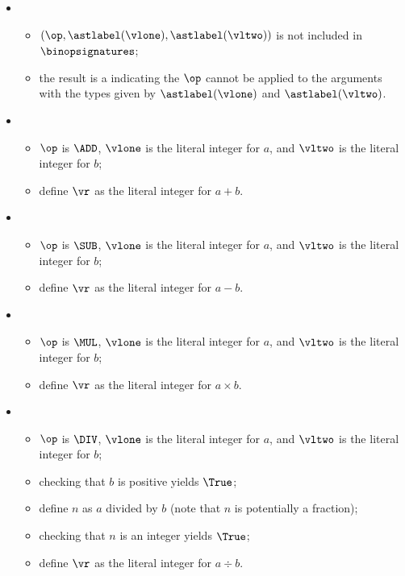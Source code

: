 \ProseParagraph
\OneApplies
\begin{itemize}
  \item {}
  \begin{itemize}
    \item $(\op, \astlabel(\vlone), \astlabel(\vltwo))$ is not included in $\binopsignatures$;
    \item the result is a \typingerrorterm{} indicating the $\op$ cannot be applied to the arguments
          with the types given by $\astlabel(\vlone)$ and $\astlabel(\vltwo)$.
  \end{itemize}

  \item {}
  \begin{itemize}
    \item $\op$ is $\ADD$, $\vlone$ is the literal integer for $a$, and $\vltwo$ is the literal integer for $b$;
    \item define $\vr$ as the literal integer for $a+b$.
  \end{itemize}

  \item {}
  \begin{itemize}
    \item $\op$ is $\SUB$, $\vlone$ is the literal integer for $a$, and $\vltwo$ is the literal integer for $b$;
    \item define $\vr$ as the literal integer for $a-b$.
  \end{itemize}

  \item {}
  \begin{itemize}
    \item $\op$ is $\MUL$, $\vlone$ is the literal integer for $a$, and $\vltwo$ is the literal integer for $b$;
    \item define $\vr$ as the literal integer for $a\times b$.
  \end{itemize}

  \item {}
  \begin{itemize}
    \item $\op$ is $\DIV$, $\vlone$ is the literal integer for $a$, and $\vltwo$ is the literal integer for $b$;
    \item checking that $b$ is positive yields $\True$\ProseOrTypeError;
    \item define $n$ as $a$ divided by $b$ (note that $n$ is potentially a fraction);
    \item checking that $n$ is an integer yields $\True$\ProseOrTypeError;
    \item define $\vr$ as the literal integer for $a\div b$.
  \end{itemize}


\end{itemize}
